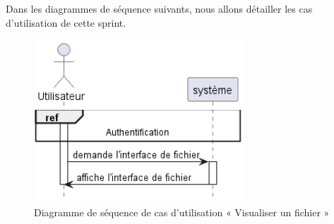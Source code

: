 Dans les diagrammes de séquence suivants, nous allons détailler les cas d'utilisation de cette sprint.\\
\begin{figure}[H]
  \centering
  \includegraphics[width=0.7\textwidth]{out/diagrams/sprint4/view_file/view_file}
  \caption{Diagramme de séquence de cas d'utilisation « Visualiser un fichier   »}
  \label{fig:sequence_view_file}
\end{figure}

